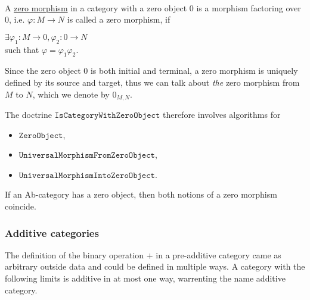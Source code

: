 \begin{definition}\label{def:zero_morphism}\phantom{}\\
A \ul{zero morphism} in a category with a zero object $0$ is a morphism factoring over $0$, i.e. $\varphi : M \rightarrow N$ is called a zero
morphism, if\\
\begin{minipage}{.35\textwidth}
\end{minipage}
\begin{minipage}{.65\textwidth}
$\exists \varphi_{1} : M \rightarrow 0, \varphi_{2} : 0 \rightarrow N$\\
such that $\varphi = \varphi_{1}\varphi_{2}$.
\end{minipage}
Since the zero object $0$ is both initial and terminal, a zero morphism is uniquely defined by its source and target, thus we can
talk about \textit{the} zero morphism from $M$ to $N$, which we denote by $0_{M,N}$.
\end{definition}

\begin{doctrine}
The doctrine $\mathtt{IsCategoryWithZeroObject}$ therefore involves algorithms for
\begin{itemize}
 \item $\mathtt{ZeroObject}$,
 \item $\mathtt{UniversalMorphismFromZeroObject}$,
 \item $\mathtt{UniversalMorphismIntoZeroObject}$.
\end{itemize}
\end{doctrine}

If an Ab-category has a zero object, then both notions of a zero morphism coincide.

\subsubsection{Additive categories}
The definition of the binary operation $+$ in a pre-additive category came as arbitrary outside data and could be defined
in multiple ways. A category with the following limits is additive in at most one way, warrenting the name additive category.

